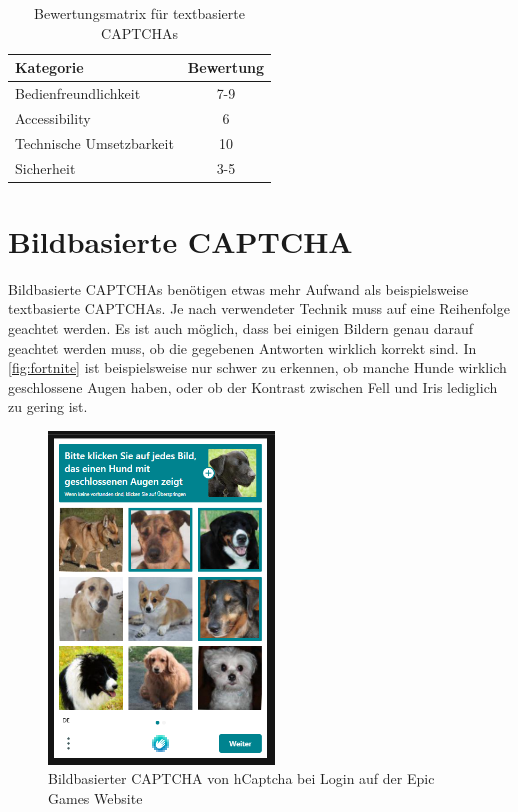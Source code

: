 \begin{table}[h!]
    \caption{Bewertungsmatrix für textbasierte CAPTCHAs}
    \begin{center}
        \begin{tabular}{l|c}
            Kategorie                       & Bewertung \\\hline
            Bedienfreundlichkeit            & 7-9         \\
            Accessibility                   & 6        \\
            Technische Umsetzbarkeit        & 10         \\
            Sicherheit                      & 3-5         
        \end{tabular}
    \end{center}
    \label{table:matrix:text}
\end{table}

\section{Bildbasierte CAPTCHA}
Bildbasierte CAPTCHAs benötigen etwas mehr Aufwand als beispielsweise textbasierte CAPTCHAs.
Je nach verwendeter Technik muss auf eine Reihenfolge geachtet werden. 
Es ist auch möglich, dass bei einigen Bildern genau darauf geachtet werden muss, ob die gegebenen Antworten wirklich korrekt sind.
In \autoref{fig:fortnite} ist beispielsweise nur schwer zu erkennen, ob manche Hunde wirklich geschlossene Augen haben, 
oder ob der Kontrast zwischen Fell und Iris lediglich zu gering ist.

\begin{figure}[h!]
    \centering\includegraphics[width=6cm]{gfx/mygraphics/fuerfortnite.png}
 \caption{Bildbasierter CAPTCHA von hCaptcha bei Login auf der Epic Games Website}
      \label{fig:fortnite}
\end{figure}

